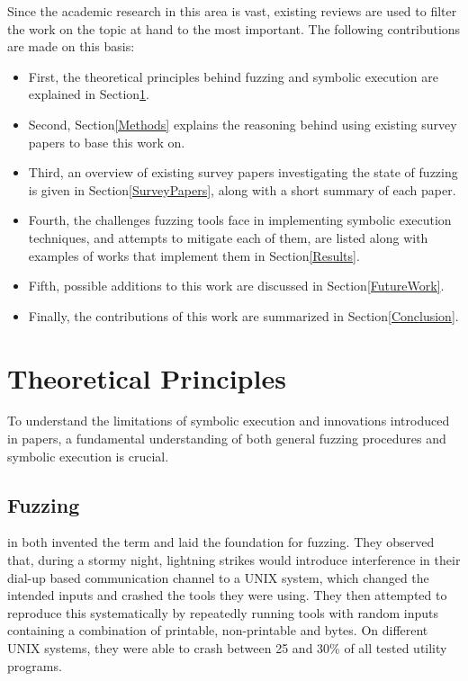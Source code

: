 \documentclass{article}
\begin{document}
\begin{multicols}{2}
    Since the academic research in this area is vast, existing reviews are used to filter the work on the topic at hand to the most important. The following contributions are made on this basis:

    \begin{itemize}
        \item First, the theoretical principles behind fuzzing and symbolic execution are explained in Section\ref{Theory}.
        \item Second, Section\ref{Methods} explains the reasoning behind using existing survey papers to base this work on.
        \item Third, an overview of existing survey papers investigating the state of fuzzing is given in Section\ref{SurveyPapers}, along with a short summary of each paper.
        \item Fourth, the challenges fuzzing tools face in implementing symbolic execution techniques, and attempts to mitigate each of them, are listed along with examples of works that implement them in Section\ref{Results}.
        \item Fifth, possible additions to this work are discussed in Section\ref{FutureWork}.
        \item Finally, the contributions of this work are summarized in Section\ref{Conclusion}.
    \end{itemize}

    \section{Theoretical Principles}
    \label{Theory}

    To understand the limitations of symbolic execution and innovations introduced in papers, a fundamental understanding of both general fuzzing procedures and symbolic execution is crucial.

    \subsection{Fuzzing}

    \citeauthor{UNIX} in \citeyear{UNIX} both invented the term and laid the foundation for fuzzing. They observed that, during a stormy night, lightning strikes would introduce interference in their dial-up based communication channel to a UNIX system, which changed the intended inputs and crashed the tools they were using. They then attempted to reproduce this systematically by repeatedly running tools with random inputs containing a combination of printable, non-printable and  bytes. On different UNIX systems, they were able to crash between 25 and 30\% of all tested utility programs.\cite{UNIX}


\end{multicols}
\end{document}
